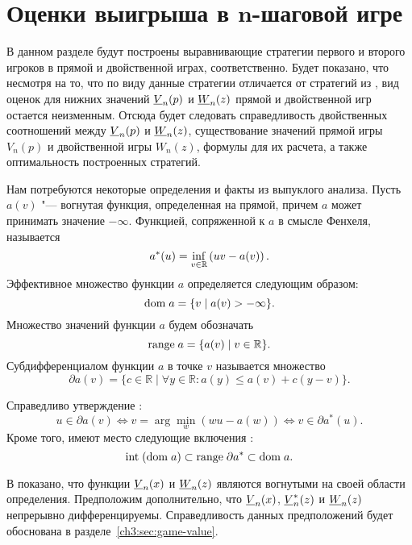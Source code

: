 {\section{Оценки выигрыша в $\mathbf{ n }$-шаговой игре}
\label{ch3:sec:value-bounds}

В данном разделе будут построены выравнивающие стратегии первого и второго игроков в прямой и двойственной играх, соответственно.
Будет показано, что несмотря на то, что по виду данные стратегии отличается от стратегий из \cite{demeyer02}, вид оценок для нижних значений $\LV{n}(p)$ и $\LW{n}(z)$ прямой и двойственной игр остается неизменным.
Отсюда будет следовать справедливость двойственных соотношений между $\LV{n}(p)$ и $\LW{n}(z)$, существование значений прямой игры $V_n(p)$ и двойственной игры $W_n(z)$, формулы для их расчета, а также оптимальность построенных стратегий.

Нам потребуются некоторые определения и факты из выпуклого анализа.
%
Пусть $a(v)$ "--- вогнутая функция, определенная на прямой, причем $a$ может принимать значение $-\infty$.
Функцией, сопряженной к $a$ в смысле Фенхеля, называется
\begin{equation*}
  a^*(u) = \inf_{v \in \mathbb{R}} \left( u v - a(v) \right).
\end{equation*}
Эффективное множество функции $a$ определяется следующим образом:
\[
\mathrm{dom\;} a = \{ v \;|\; a(v) > -\infty \}.
\]
Множество значений функции $a$ будем обозначать \[
\mathrm{range\;} a = \{ a(v) \;|\; v \in \mathbb{R} \}.
\]
%
Субдифференциалом функции $a$ в точке $v$ называется множество
\begin{equation*}
  \partial a(v) =
  \{ c \in \mathbb{R} \;|\; \forall y \in \mathbb{R}: a(y) \leqslant a(v) + c(y-v) \}.
\end{equation*}

Справедливо утверждение \cite[Теорема 23.5]{rockafellar73}:
\begin{equation}\label{ch3:eq:subdiff-props}
  u \in \partial a(v)
  \iff v = \arg\!\min_w \left( w u - a(w) \right)
  \iff v \in \partial a^*(u) .
\end{equation}
Кроме того, имеют место следующие включения \cite[\S~24]{rockafellar73}:
\begin{equation}\label{ch3:eq:dual-range}
  \mathrm{int} \; (\mathrm{dom\;} a) \subset \mathrm{range\;} \partial a^* \subset \mathrm{dom\;} a.
\end{equation}

В \cite{demeyer02} показано, что функции $\LV{n}(x)$ и $\LW{n}(z)$ являются вогнутыми на своей области определения.
Предположим дополнительно, что $\LV{n}(x)$, $\LV[*]{n}(z)$ и $\LW{n}(z)$ непрерывно дифференцируемы.
Справедливость данных предположений будет обоснована в разделе~\ref{ch3:sec:game-value}.


}
